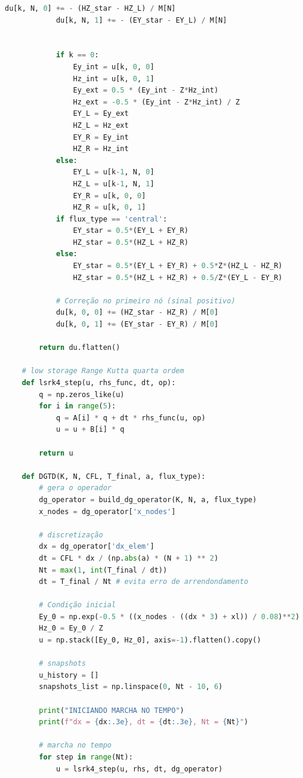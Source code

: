 \begin{anexosenv}
\begin{lstlisting}[language=Python, breaklines=true, basicstyle=\tiny]
            du[k, N, 0] += - (HZ_star - HZ_L) / M[N]
            du[k, N, 1] += - (EY_star - EY_L) / M[N]
        
        
            if k == 0:
                Ey_int = u[k, 0, 0]
                Hz_int = u[k, 0, 1]
                Ey_ext = 0.5 * (Ey_int - Z*Hz_int)
                Hz_ext = -0.5 * (Ey_int - Z*Hz_int) / Z 
                EY_L = Ey_ext
                HZ_L = Hz_ext
                EY_R = Ey_int
                HZ_R = Hz_int
            else:
                EY_L = u[k-1, N, 0]
                HZ_L = u[k-1, N, 1]
                EY_R = u[k, 0, 0]
                HZ_R = u[k, 0, 1]
            if flux_type == 'central':
                EY_star = 0.5*(EY_L + EY_R)
                HZ_star = 0.5*(HZ_L + HZ_R)
            else:
                EY_star = 0.5*(EY_L + EY_R) + 0.5*Z*(HZ_L - HZ_R)
                HZ_star = 0.5*(HZ_L + HZ_R) + 0.5/Z*(EY_L - EY_R)
            
            # Correção no primeiro nó (sinal positivo)
            du[k, 0, 0] += (HZ_star - HZ_R) / M[0]
            du[k, 0, 1] += (EY_star - EY_R) / M[0]
            
        return du.flatten()

    # low storage Range Kutta quarta ordem
    def lsrk4_step(u, rhs_func, dt, op):
        q = np.zeros_like(u)
        for i in range(5):
            q = A[i] * q + dt * rhs_func(u, op)
            u = u + B[i] * q
            
        return u

    def DGTD(K, N, CFL, T_final, a, flux_type):
        # gera o operador
        dg_operator = build_dg_operator(K, N, a, flux_type)
        x_nodes = dg_operator['x_nodes']
        
        # discretização
        dx = dg_operator['dx_elem']
        dt = CFL * dx / (np.abs(a) * (N + 1) ** 2)
        Nt = max(1, int(T_final / dt))
        dt = T_final / Nt # evita erro de arrendondamento
        
        # Condição inicial
        Ey_0 = np.exp(-0.5 * ((x_nodes - ((dx * 3) + xl)) / 0.08)**2)
        Hz_0 = Ey_0 / Z
        u = np.stack([Ey_0, Hz_0], axis=-1).flatten().copy()
        
        # snapshots
        u_history = []
        snapshots_list = np.linspace(0, Nt - 10, 6)
        
        print("INICIANDO MARCHA NO TEMPO")
        print(f"dx = {dx:.3e}, dt = {dt:.3e}, Nt = {Nt}")
        
        # marcha no tempo
        for step in range(Nt):
            u = lsrk4_step(u, rhs, dt, dg_operator)
            

\end{lstlisting}
\end{anexosenv}
